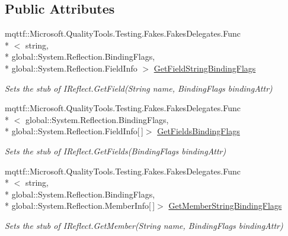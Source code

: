 \subsection*{Public Attributes}
\begin{DoxyCompactItemize}
\item 
mqttf\-::\-Microsoft.\-Quality\-Tools.\-Testing.\-Fakes.\-Fakes\-Delegates.\-Func\\*
$<$ string, \\*
global\-::\-System.\-Reflection.\-Binding\-Flags, \\*
global\-::\-System.\-Reflection.\-Field\-Info $>$ \hyperlink{class_system_1_1_reflection_1_1_fakes_1_1_stub_i_reflect_a175f58085b2c07113806297f0047e7ca}{Get\-Field\-String\-Binding\-Flags}
\begin{DoxyCompactList}\small\item\em Sets the stub of I\-Reflect.\-Get\-Field(\-String name, Binding\-Flags binding\-Attr)\end{DoxyCompactList}\item 
mqttf\-::\-Microsoft.\-Quality\-Tools.\-Testing.\-Fakes.\-Fakes\-Delegates.\-Func\\*
$<$ global\-::\-System.\-Reflection.\-Binding\-Flags, \\*
global\-::\-System.\-Reflection.\-Field\-Info\mbox{[}$\,$\mbox{]}$>$ \hyperlink{class_system_1_1_reflection_1_1_fakes_1_1_stub_i_reflect_a83c7f3569ac6536ad892078480432d83}{Get\-Fields\-Binding\-Flags}
\begin{DoxyCompactList}\small\item\em Sets the stub of I\-Reflect.\-Get\-Fields(\-Binding\-Flags binding\-Attr)\end{DoxyCompactList}\item 
mqttf\-::\-Microsoft.\-Quality\-Tools.\-Testing.\-Fakes.\-Fakes\-Delegates.\-Func\\*
$<$ string, \\*
global\-::\-System.\-Reflection.\-Binding\-Flags, \\*
global\-::\-System.\-Reflection.\-Member\-Info\mbox{[}$\,$\mbox{]}$>$ \hyperlink{class_system_1_1_reflection_1_1_fakes_1_1_stub_i_reflect_aef3171bf34c1820f32bf43e676da4fd7}{Get\-Member\-String\-Binding\-Flags}
\begin{DoxyCompactList}\small\item\em Sets the stub of I\-Reflect.\-Get\-Member(\-String name, Binding\-Flags binding\-Attr)\end{DoxyCompactList}\item 

\end{DoxyCompactItemize}
